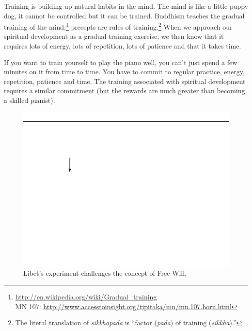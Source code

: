 Training is building up natural habits in the mind. The mind is like a little puppy dog, it cannot be controlled but it can be trained. Buddhism teaches the gradual training of the mind;\footnote{\url{http://en.wikipedia.org/wiki/Gradual_training}\\MN 107: \url{http://www.accesstoinsight.org/tipitaka/mn/mn.107.horn.html}} precepts are rules of training.\footnote{The literal translation of \textit{sikkhāpada} is “factor (\textit{pada}) of training (\textit{sikkhā}).”} When we approach our spiritual development as a gradual training exercise, we then know that it requires lots of energy, lots of repetition, lots of patience and that it takes time. 

If you want to train yourself to play the piano well, you can’t just spend a few minutes on it from time to time. You have to commit to regular practice, energy, repetition, patience and time. The training associated with spiritual development requires a similar commitment (but the rewards are much greater than becoming a skilled pianist).

\begin{figure}[H]
\centering
\includegraphics[width=1\linewidth]{./Diagrams/Libet}
\caption{Libet’s experiment challenges the concept of Free Will.}
\label{fig:Libet}
\end{figure}

